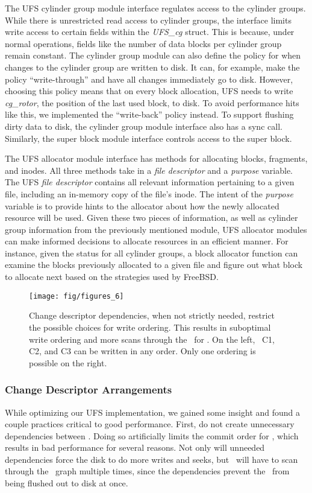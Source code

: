 The UFS cylinder group module interface regulates access to the cylinder
groups. While there is unrestricted read access to cylinder groups, the
interface limits write access to certain fields within the \emph{UFS\_cg}
struct. This is because, under normal operations, fields like the number of
data blocks per cylinder group remain constant. The cylinder group module can
also define the policy for when changes to the cylinder group are written to
disk. It can, for example, make the policy ``write-through'' and have all
changes immediately go to disk. However, choosing this policy means that on
every block allocation, UFS needs to write \emph{cg\_rotor}, the position of
the last used block, to disk. To avoid performance hits like this, we
implemented the ``write-back'' policy instead. To support flushing dirty data
to disk, the cylinder group module interface also has a sync call. Similarly,
the super block module interface controls access to the super block.

The UFS allocator module interface has methods for allocating blocks,
fragments, and inodes. All three methods take in a \emph{file descriptor} and a
\emph{purpose} variable. The UFS \emph{file descriptor} contains all relevant
information pertaining to a given file, including an in-memory copy of the
file's inode. The intent of the \emph{purpose} variable is to provide hints to
the allocator about how the newly allocated resource will be used.  Given these
two pieces of information, as well as cylinder group information from the
previously mentioned module, UFS allocator modules can make informed decisions
to allocate resources in an efficient manner. For instance, given the status
for all cylinder groups, a block allocator function can examine the blocks
previously allocated to a given file and figure out what block to allocate
next based on the strategies used by FreeBSD.

\begin{figure}[htb]
  \centering
  \texttt{[image: fig/figures\_6]}
  \caption{\label{fig:chdescarrange} Change descriptor dependencies, when
  not strictly needed, restrict the possible choices for write ordering.
  This results in suboptimal write ordering and more scans through the
  \chdescs\ for \Kudos. On the left, \chdescs\ C1, C2, and C3 can be written
  in any order. Only one ordering is possible on the right.}
\end{figure}

\subsubsection {Change Descriptor Arrangements}
While optimizing our UFS implementation, we gained some insight and found a
couple practices critical to good performance. First, do not create unnecessary
dependencies between \chdescs. Doing so artificially limits the commit order
for \chdescs, which results in bad performance for several reasons. Not only
will unneeded dependencies force the disk to do more writes and seeks, but
\Kudos\ will have to scan through the \chdesc\ graph multiple times, since the
dependencies prevent the \chdescs\ from being flushed out to disk at once.

